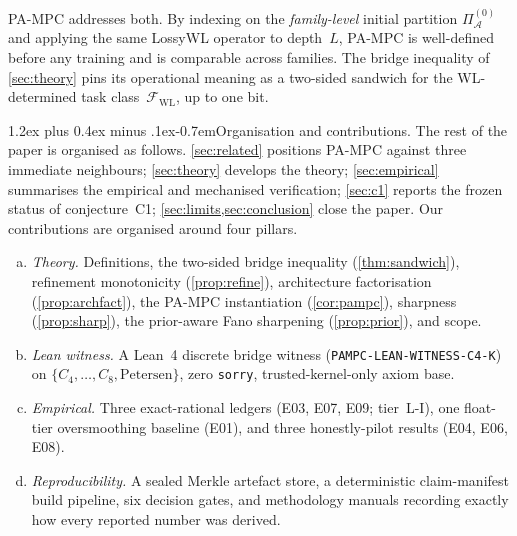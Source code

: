 \documentclass[10pt]{article}
\makeatletter
\def\paragraph{\@startsection{paragraph}{4}{\z@}%
  {1.2ex plus 0.4ex minus .1ex}{-0.7em}{\normalsize\bf}}
\theoremstyle{definition}
\theoremstyle{remark}
\newcommand{\Fwl}{\mathcal{F}_{\mathrm{WL}}}
\makeatother
\begin{document}
PA-MPC addresses both. By indexing on the \emph{family-level}
initial partition $\Pi^{(0)}_{\mathcal{A}}$ and applying the same
LossyWL operator to depth~$L$, PA-MPC is well-defined before any
training and is comparable across families. The bridge inequality of
\cref{sec:theory} pins its operational meaning as a two-sided
sandwich for the WL-determined task class~$\Fwl$, up to one bit.

\paragraph{Organisation and contributions.}
The rest of the paper is organised as follows.
\cref{sec:related} positions PA-MPC against three immediate
neighbours; \cref{sec:theory} develops the theory;
\cref{sec:empirical} summarises the empirical and mechanised
verification; \cref{sec:c1} reports the frozen status of
conjecture~C1; \cref{sec:limits,sec:conclusion} close the paper.
Our contributions are organised around four pillars.
\begin{enumerate}[(a)]
  \item \emph{Theory.} Definitions, the two-sided bridge inequality
    (\cref{thm:sandwich}), refinement monotonicity
    (\cref{prop:refine}), architecture factorisation
    (\cref{prop:archfact}), the PA-MPC instantiation
    (\cref{cor:pampc}), sharpness (\cref{prop:sharp}), the
    prior-aware Fano sharpening (\cref{prop:prior}), and scope.
  \item \emph{Lean witness.} A Lean~4 discrete bridge witness
    (\verb|PAMPC-LEAN-WITNESS-C4-K|) on
    $\{C_4,\ldots,C_8,\text{Petersen}\}$, zero \texttt{sorry},
    trusted-kernel-only axiom base.
  \item \emph{Empirical.} Three exact-rational ledgers (E03, E07,
    E09; tier~L-I), one float-tier oversmoothing baseline (E01),
    and three honestly-pilot results (E04, E06, E08).
  \item \emph{Reproducibility.} A sealed Merkle artefact store, a
    deterministic claim-manifest build pipeline, six decision gates,
    and methodology manuals recording exactly how every reported
    number was derived.
\end{enumerate}
\end{document}
